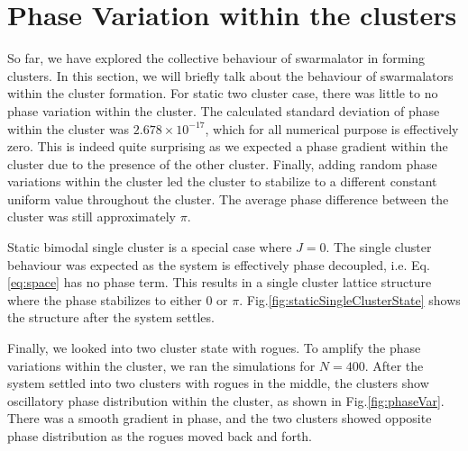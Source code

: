 \documentclass[twocolumn,10pt]{asme2ej}
\begin{document}
\section{Phase Variation within the clusters}
{
    So far, we have explored the collective behaviour of swarmalator in forming clusters. In this section, we will briefly talk about the behaviour of swarmalators within the cluster formation. For static two cluster case, there was little to no phase variation within the cluster. The calculated standard deviation of phase within the cluster was \(2.678 \times 10^{-17}\), which for all numerical purpose is effectively zero. This is indeed quite surprising as we expected a phase gradient within the cluster due to the presence of the other cluster. Finally, adding random phase variations within the cluster led the cluster to stabilize to a different constant uniform value throughout the cluster. The average phase difference between the cluster was still approximately \(\pi\). 

    Static bimodal single cluster is a special case where \(J = 0\). The single cluster behaviour was expected as the system is effectively phase decoupled, i.e. Eq.\ref{eq:space} has no phase term. This results in a single cluster lattice structure where the phase stabilizes to either \(0\) or \(\pi\). Fig.\ref{fig:staticSingleClusterState} shows the structure after the system settles.

    Finally, we looked into two cluster state with rogues. To amplify the phase variations within the cluster, we ran the simulations for \(N = 400\). After the system settled into two clusters with rogues in the middle, the clusters show oscillatory phase distribution within the cluster, as shown in Fig.\ref{fig:phaseVar}. There was a smooth gradient in phase, and the two clusters showed opposite phase distribution as the rogues moved back and forth. %

}
\end{document}
